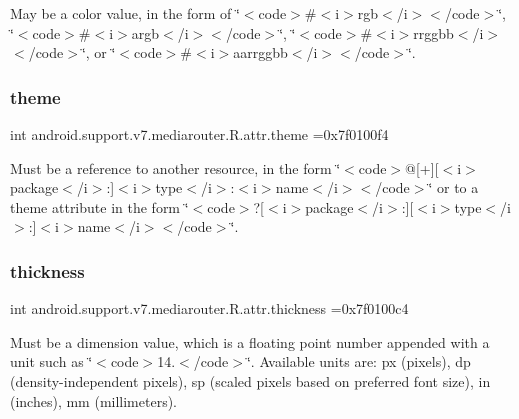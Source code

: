 May be a color value, in the form of \char`\"{}$<$code$>$\#$<$i$>$rgb$<$/i$>$$<$/code$>$\char`\"{}, \char`\"{}$<$code$>$\#$<$i$>$argb$<$/i$>$$<$/code$>$\char`\"{}, \char`\"{}$<$code$>$\#$<$i$>$rrggbb$<$/i$>$$<$/code$>$\char`\"{}, or \char`\"{}$<$code$>$\#$<$i$>$aarrggbb$<$/i$>$$<$/code$>$\char`\"{}. \mbox{\label{classandroid_1_1support_1_1v7_1_1mediarouter_1_1R_1_1attr_ad067d9f19426f54954ba24757134b5c0}} 
\subsubsection{\texorpdfstring{theme}{theme}}
{\footnotesize\ttfamily int android.\+support.\+v7.\+mediarouter.\+R.\+attr.\+theme =0x7f0100f4\hspace{0.3cm}{\ttfamily [static]}}

Must be a reference to another resource, in the form \char`\"{}$<$code$>$@\mbox{[}+\mbox{]}\mbox{[}$<$i$>$package$<$/i$>$\+:\mbox{]}$<$i$>$type$<$/i$>$\+:$<$i$>$name$<$/i$>$$<$/code$>$\char`\"{} or to a theme attribute in the form \char`\"{}$<$code$>$?\mbox{[}$<$i$>$package$<$/i$>$\+:\mbox{]}\mbox{[}$<$i$>$type$<$/i$>$\+:\mbox{]}$<$i$>$name$<$/i$>$$<$/code$>$\char`\"{}. \mbox{\label{classandroid_1_1support_1_1v7_1_1mediarouter_1_1R_1_1attr_a72390830cb40268bf0727b9d2964518b}} 
\subsubsection{\texorpdfstring{thickness}{thickness}}
{\footnotesize\ttfamily int android.\+support.\+v7.\+mediarouter.\+R.\+attr.\+thickness =0x7f0100c4\hspace{0.3cm}{\ttfamily [static]}}

Must be a dimension value, which is a floating point number appended with a unit such as \char`\"{}$<$code$>$14.\+5sp$<$/code$>$\char`\"{}. Available units are\+: px (pixels), dp (density-\/independent pixels), sp (scaled pixels based on preferred font size), in (inches), mm (millimeters). 

